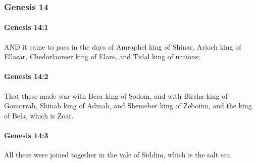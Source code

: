 	\subsubsection{Genesis 14} %
		\label{GENESIS-14}
		
		\paragraph{Genesis 14:1} %
			\label{GENESIS-14-1}

			AND it came to pass in the days of Amraphel king of Shinar, Arioch king of Ellasar, Chedorlaomer king of Elam, and Tidal king of nations;


		\paragraph{Genesis 14:2} %
			\label{GENESIS-14-2}

			That these made war with Bera king of Sodom, and with Birsha king of Gomorrah, Shinab king of Admah, and Shemeber king of Zeboiim, and the king of Bela, which is Zoar.


		\paragraph{Genesis 14:3} %
			\label{GENESIS-14-3}

			All these were joined together in the vale of Siddim, which is the salt sea.

